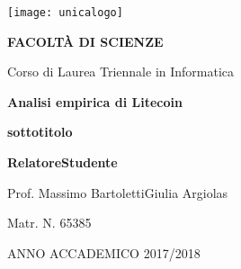 \begin{spacing}{0.90}
\begin{center}
{\Large \thispagestyle{empty}}{\texttt{[image: unicalogo]}}\par
\end{center}
\end{spacing}

\noindent 
\begin{center}
\vspace{0.7cm}
\textbf{}\par
\end{center}{\LARGE \par}

\noindent 
\begin{center}
\textbf{\large FACOLT\`A DI SCIENZE}\par
\end{center}{\large \par}

\noindent
\begin{center}
{\large Corso di Laurea Triennale in Informatica}\par  %
\end{center}{\large \par}

\vspace{2.6cm}


\begin{center}
\textbf{\LARGE Analisi empirica di Litecoin}\par
\end{center}{\LARGE \par}

\begin{center}
\textbf{\large sottotitolo}\par
\end{center}{\LARGE \par}

\begin{spacing}{0.90}
\vspace{3.7cm}
\textbf{\large Relatore}{\large \hfill{}}\textbf{\large Studente}{\large \par}
\end{spacing}

{\large Prof. Massimo Bartoletti\hfill{}Giulia Argiolas~}{\large \par}

\begin{spacing}{0.90}
{\large \hfill{}Matr. N. 65385}{\large \par}
\end{spacing}

\vspace{2.5cm}


\begin{center}
ANNO ACCADEMICO 2017/2018\par 
\end{center}